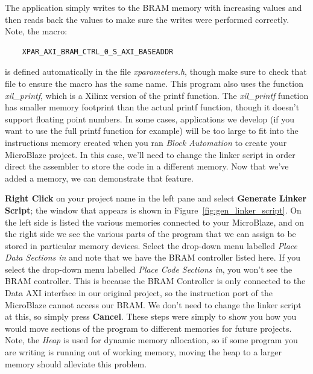 \documentclass[11pt]{article}
\begin{document}
The application simply writes to the BRAM memory with increasing values and then reads back the values to make sure the writes were performed correctly. Note, the macro:

\begin{verbatim}
    XPAR_AXI_BRAM_CTRL_0_S_AXI_BASEADDR
\end{verbatim}

\noindent
is defined automatically in the file \textit{xparameters.h}, though make sure to check that file to ensure the macro has the same name. This program also uses the function \textit{xil\_printf}, which is a Xilinx version of the printf function. The \textit{xil\_printf} function has smaller memory footprint than the actual printf function, though it doesn't support floating point numbers. In some cases, applications we develop (if you want to use the full printf function for example) will be too large to fit into the instructions memory created when you ran \textit{Block Automation} to create your MicroBlaze project. In this case, we'll need to change the linker script in order direct the assembler to store the code in a different memory. Now that we've added a memory, we can demonstrate that feature.

\textbf{Right Click} on your project name in the left pane and select \textbf{Generate Linker Script}; the window that appears is shown in Figure~\ref{fig:gen_linker_script}. On the left side is listed the various memories connected to your MicroBlaze, and on the right side we see the various parts of the program that we can assign to be stored in particular memory devices. Select the drop-down menu labelled \textit{Place Data Sections in} and note that we have the BRAM controller listed here. If you select the drop-down menu labelled \textit{Place Code Sections in}, you won't see the BRAM controller. This is because the BRAM Controller is only connected to the Data AXI interface in our original project, so the instruction port of the MicroBlaze cannot access our BRAM. We don't need to change the linker script at this, so simply press \textbf{Cancel}. These steps were simply to show you how you would move sections of the program to different memories for future projects. Note, the \textit{Heap} is used for dynamic memory allocation, so if some program you are writing is running out of working memory, moving the heap to a larger memory should alleviate this problem.
\end{document}
